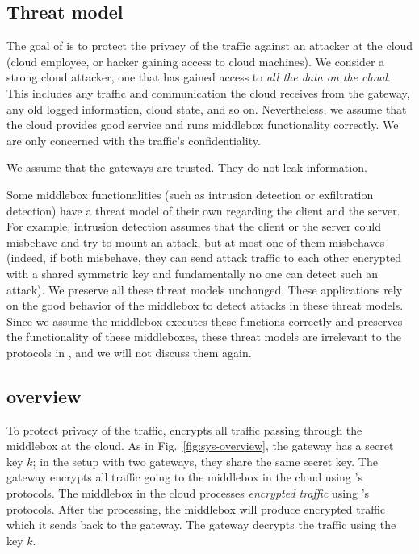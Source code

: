 

\subsection{Threat model}

The goal of \sys is to protect the privacy of the traffic against an attacker at the cloud 
(cloud employee, or hacker gaining access to cloud machines). 
We consider a strong cloud attacker, one that has gained access to {\em all the data on the cloud}.
This includes any traffic and communication the cloud receives from the 
gateway, any old logged information, cloud state, and so on. Nevertheless, we assume that 
the cloud provides good service and runs middlebox functionality correctly.  We are only concerned with 
the traffic's confidentiality.

We assume that the gateways are trusted. They do not leak information.


Some middlebox functionalities (such as intrusion detection or exfiltration detection) have a threat model
of their own regarding the client and the server. For example, intrusion detection assumes that 
the client or the server could misbehave and try to mount an attack, but at most one of them misbehaves~\cite{Bro}  
(indeed, if both misbehave, they can send attack traffic to each other encrypted with a shared symmetric key and fundamentally
no one can detect such an attack).  We preserve all these threat models unchanged. These applications rely
on the good behavior of the middlebox to detect attacks in these threat models. Since we assume the middlebox executes
these functions correctly and \sys preserves the functionality of these middleboxes, 
these threat models are irrelevant to the protocols in \sys, and we will not discuss them again. 



\subsection{\sys overview}


To protect privacy of the traffic, \sys encrypts all traffic passing through the middlebox at the cloud. 
As in Fig.~\ref{fig:sys-overview}, the gateway has a secret key $k$; in the setup with two gateways, they share
the same secret key. The gateway encrypts all traffic going to the middlebox in the cloud using \sys's protocols.
The middlebox in the cloud processes {\em encrypted traffic} using \sys's protocols. 
After the processing, the middlebox
will produce encrypted traffic which it sends back to the gateway. The gateway decrypts the traffic using the key $k$.

